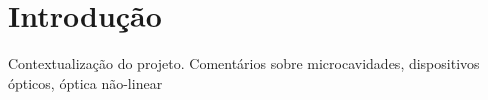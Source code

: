 \chapter{Introdução}

Contextualização do projeto. Comentários sobre microcavidades, dispositivos ópticos, óptica não-linear